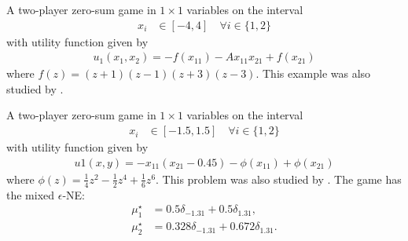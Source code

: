 \begin{game}\label{ex.zheng23.bilinearly.coupled.minimax}
A two-player zero-sum game in $1 \times 1$ variables on the interval
\begin{align*}
    x_i &\in [-4,4] \quad \forall i \in \{1,2\}
\end{align*}
with utility function \cite[Bilinearly-coupled Minimax]{zheng.zhu.ea:universal} given by
\begin{align*}
u_1(x_1, x_2) = - f(x_{11}) - Ax_{11}x_{21} + f(x_{21})
\end{align*}
where $f(z)=(z + 1)(z - 1)(z + 3)(z - 3)$. This example was also studied by \textcite{Grimmer2023}.
\end{game}

\begin{game}\label{ex.zheng23.forsaken}
A two-player zero-sum game in $1 \times 1$ variables on the interval
\begin{align*}
    x_i &\in [-1.5,1.5] \quad \forall i \in \{1,2\}
\end{align*}
with utility function \cite[“Forsaken” example]{zheng.zhu.ea:universal} given by
\begin{align*}
u1(x, y) = - x_{11}(x_{21}-0.45) - \phi(x_{11}) + \phi(x_{21})
\end{align*}
where $\phi(z) = \frac{1}{4}z^2 - \frac{1}{2}  z^4 + \frac{1}{6}z^6$. This problem was also studied by \textcite[Example~5.2]{pmlr-v139-hsieh21a}. The game has the mixed $\epsilon$-NE:
\begin{align*}
\mu_1^\star &= 0.5\delta_{ -1.31 } + 0.5\delta_{ 1.31 },\\
\mu_2^\star &= 0.328\delta_{ -1.31 } + 0.672\delta_{ 1.31 }.
\end{align*}
\end{game}
